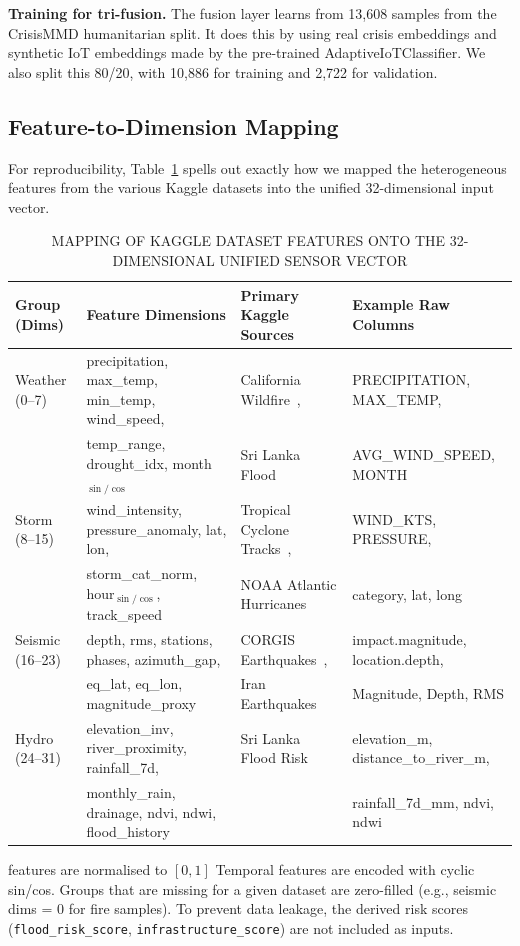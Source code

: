 \documentclass[journal]{IEEEtran}
\begin{document}
\textbf{Training for tri-fusion.} The fusion layer learns from 13,608 samples from the CrisisMMD humanitarian split. It does this by using real crisis embeddings and synthetic IoT embeddings made by the pre-trained AdaptiveIoTClassifier. We also split this 80/20, with 10,886 for training and 2,722 for validation.

\subsection{Feature-to-Dimension Mapping}
\label{sec:feature_mapping}

For reproducibility, Table~\ref{tab:feature_mapping} spells out exactly how we mapped the heterogeneous features from the various Kaggle datasets into the unified 32-dimensional input vector.

\begin{table}[!t]
\centering
\caption{MAPPING OF KAGGLE DATASET FEATURES ONTO THE 32-DIMENSIONAL UNIFIED SENSOR VECTOR}
\label{tab:feature_mapping}
\begin{tabular}{llll}
\toprule
\textbf{Group (Dims)} & \textbf{Feature Dimensions} & \textbf{Primary Kaggle Sources} & \textbf{Example Raw Columns} \\
\midrule
Weather (0--7) & precipitation, max\_temp, min\_temp, wind\_speed, & California Wildfire~\cite{kaggle_fire}, & PRECIPITATION, MAX\_TEMP, \\
 & temp\_range, drought\_idx, month$_{\sin/\cos}$ & Sri Lanka Flood~\cite{kaggle_srilanka_flood} & AVG\_WIND\_SPEED, MONTH \\
\midrule
Storm (8--15) & wind\_intensity, pressure\_anomaly, lat, lon, & Tropical Cyclone Tracks~\cite{kaggle_cyclone_tracks}, & WIND\_KTS, PRESSURE, \\
 & storm\_cat\_norm, hour$_{\sin/\cos}$, track\_speed & NOAA Atlantic Hurricanes~\cite{kaggle_storm_atl} & category, lat, long \\
\midrule
Seismic (16--23) & depth, rms, stations, phases, azimuth\_gap, & CORGIS Earthquakes~\cite{corgis_eq}, & impact.magnitude, location.depth, \\
 & eq\_lat, eq\_lon, magnitude\_proxy & Iran Earthquakes~\cite{kaggle_eq_iran} & Magnitude, Depth, RMS \\
\midrule
Hydro (24--31) & elevation\_inv, river\_proximity, rainfall\_7d, & Sri Lanka Flood Risk~\cite{kaggle_srilanka_flood} & elevation\_m, distance\_to\_river\_m, \\
 & monthly\_rain, drainage, ndvi, ndwi, flood\_history & & rainfall\_7d\_mm, ndvi, ndwi \\
\bottomrule
\end{tabular}
\vspace{2pt}
\raggedright\scriptsize{features are normalised to $[0, 1]$ Temporal features are encoded with cyclic sin/cos. Groups that are missing for a given dataset are zero-filled (e.g., seismic dims = 0 for fire samples). To prevent data leakage, the derived risk scores (\texttt{flood\_risk\_score}, \texttt{infrastructure\_score}) are not included as inputs.}
\end{table}
\end{document}
